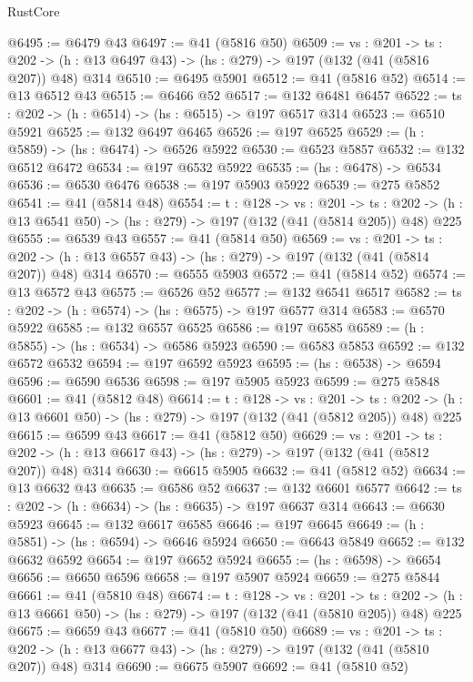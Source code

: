 \begin{lexlean}{RustCore}
\begin{coremodule}
@6495 := @6479 @43
@6497 := @41 (@5816 @50)
@6509 := {vs : @201} ->
  {ts : @202} -> (h : @13 @6497 @43) -> (hs : @279) -> @197 (@132 (@41 (@5816 @207)) @48) @314
@6510 := @6495 @5901
@6512 := @41 (@5816 @52)
@6514 := @13 @6512 @43
@6515 := @6466 @52
@6517 := @132 @6481 @6457
@6522 := {ts : @202} -> (h : @6514) -> (hs : @6515) -> @197 @6517 @314
@6523 := @6510 @5921
@6525 := @132 @6497 @6465
@6526 := @197 @6525
@6529 := (h : @5859) -> (hs : @6474) -> @6526 @5922
@6530 := @6523 @5857
@6532 := @132 @6512 @6472
@6534 := @197 @6532 @5922
@6535 := (hs : @6478) -> @6534
@6536 := @6530 @6476
@6538 := @197 @5903 @5922
@6539 := @275 @5852
@6541 := @41 (@5814 @48)
@6554 := {t : @128} ->
  {vs : @201} ->
  {ts : @202} -> (h : @13 @6541 @50) -> (hs : @279) -> @197 (@132 (@41 (@5814 @205)) @48) @225
@6555 := @6539 @43
@6557 := @41 (@5814 @50)
@6569 := {vs : @201} ->
  {ts : @202} -> (h : @13 @6557 @43) -> (hs : @279) -> @197 (@132 (@41 (@5814 @207)) @48) @314
@6570 := @6555 @5903
@6572 := @41 (@5814 @52)
@6574 := @13 @6572 @43
@6575 := @6526 @52
@6577 := @132 @6541 @6517
@6582 := {ts : @202} -> (h : @6574) -> (hs : @6575) -> @197 @6577 @314
@6583 := @6570 @5922
@6585 := @132 @6557 @6525
@6586 := @197 @6585
@6589 := (h : @5855) -> (hs : @6534) -> @6586 @5923
@6590 := @6583 @5853
@6592 := @132 @6572 @6532
@6594 := @197 @6592 @5923
@6595 := (hs : @6538) -> @6594
@6596 := @6590 @6536
@6598 := @197 @5905 @5923
@6599 := @275 @5848
@6601 := @41 (@5812 @48)
@6614 := {t : @128} ->
  {vs : @201} ->
  {ts : @202} -> (h : @13 @6601 @50) -> (hs : @279) -> @197 (@132 (@41 (@5812 @205)) @48) @225
@6615 := @6599 @43
@6617 := @41 (@5812 @50)
@6629 := {vs : @201} ->
  {ts : @202} -> (h : @13 @6617 @43) -> (hs : @279) -> @197 (@132 (@41 (@5812 @207)) @48) @314
@6630 := @6615 @5905
@6632 := @41 (@5812 @52)
@6634 := @13 @6632 @43
@6635 := @6586 @52
@6637 := @132 @6601 @6577
@6642 := {ts : @202} -> (h : @6634) -> (hs : @6635) -> @197 @6637 @314
@6643 := @6630 @5923
@6645 := @132 @6617 @6585
@6646 := @197 @6645
@6649 := (h : @5851) -> (hs : @6594) -> @6646 @5924
@6650 := @6643 @5849
@6652 := @132 @6632 @6592
@6654 := @197 @6652 @5924
@6655 := (hs : @6598) -> @6654
@6656 := @6650 @6596
@6658 := @197 @5907 @5924
@6659 := @275 @5844
@6661 := @41 (@5810 @48)
@6674 := {t : @128} ->
  {vs : @201} ->
  {ts : @202} -> (h : @13 @6661 @50) -> (hs : @279) -> @197 (@132 (@41 (@5810 @205)) @48) @225
@6675 := @6659 @43
@6677 := @41 (@5810 @50)
@6689 := {vs : @201} ->
  {ts : @202} -> (h : @13 @6677 @43) -> (hs : @279) -> @197 (@132 (@41 (@5810 @207)) @48) @314
@6690 := @6675 @5907
@6692 := @41 (@5810 @52)

\end{coremodule}
\end{lexlean}
